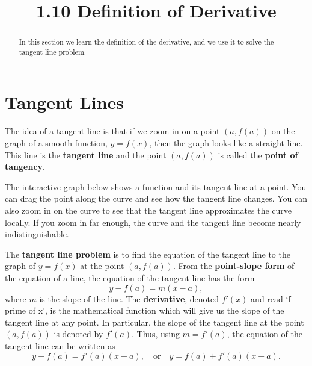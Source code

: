 \documentclass[handout]{ximera}
\title{1.10 Definition of Derivative}
\begin{document}
\begin{abstract}
In this section we learn the definition of the derivative, and we use it to solve the tangent line problem.
\end{abstract}

\maketitle


\section{Tangent Lines}










The idea of a tangent line is that if we zoom in on a point $(a, f(a))$ on the graph of a smooth function, $y = f(x)$, 
then the graph looks like a straight line. 
This line is the \textbf{tangent line} and the point $(a, f(a))$ is called the \textbf{point of tangency}.



The interactive graph below shows a function and its tangent line at a point.  
You can drag the point along the curve and see how the tangent line changes.
You can also zoom in on the curve to see that the tangent line approximates the curve
locally.  If you zoom in far enough, the curve and the tangent line become nearly indistinguishable.









The \textbf{tangent line problem} is to find the equation of the tangent line to the graph of $y = f(x)$
at the point $(a, f(a))$. From the \textbf{point-slope form} of the equation of a line,
the equation of the tangent line has the form
\[
y -f(a) = m(x-a),
\]
where $m$ is the slope of the line.  The \textbf{derivative}, denoted $f'(x)$ and read `f prime of x', is the mathematical 
function which will give us the slope of the tangent line at any point.  
In particular, the slope of the tangent line at the point $(a, f(a))$ is denoted by $f'(a)$.
Thus, using $m = f'(a)$, the equation of the tangent line can be written as
\[
y - f(a) = f'(a)(x-a), \quad \text{or} \quad y = f(a) + f'(a)(x-a).
\]
\end{document}
